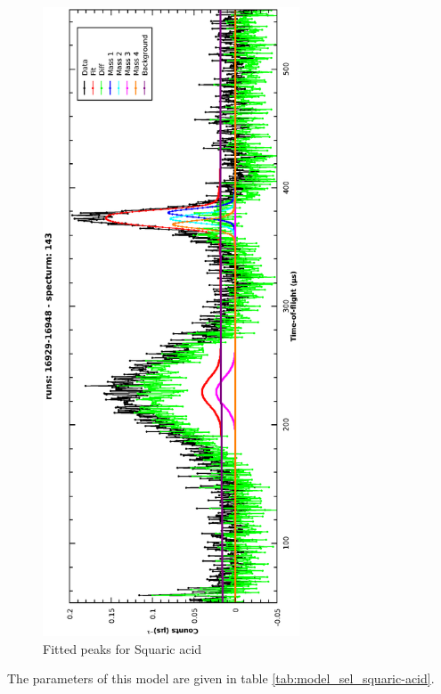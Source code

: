 \documentclass[a4paper]{article}
\begin{document}
\begin{figure}[h!]
  \centering
  \vspace{-60pt}
  \begin{turn}{-90}
    \includegraphics[width=0.68\textwidth]{graphics/model_sel_squaric-acid.eps}
  \end{turn}
  \vspace{-60pt}
  \caption{Fitted peaks for Squaric acid}
  \label{fig:model_sel_squaric-acid}
\end{figure}
\FloatBarrier

The parameters of this model are given in table
\ref{tab:model_sel_squaric-acid}.
\end{document}
